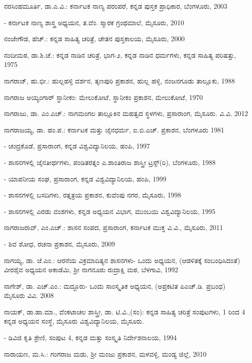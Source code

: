 \noindent
ನರಸಿಂಹಮೂರ್ತಿ, ಡಾ.ಎ.ವಿ.: ಕರ್ನಾಟಕ ನಾಣ್ಯ ಪರಂಪರೆ, ಕನ್ನಡ ಪುಸ್ತಕ ಪ್ರಾಧಿಕಾರ, ಬೆಂಗಳೂರು, 2003

- ಕರ್ನಾಟಕ ನಾಣ್ಯ ಶಾಸ್ತ್ರ ಅಧ್ಯಯನ, ತ.ವೆಂ. ಸ್ಮಾರಕ ಗ್ರಂಥಮಾಲೆ, ಮೈಸೂರು, 2010

\noindent
ನಂಜೇಗೌಡ, ಹೆಚ್​.: ಕನ್ನಡ ಸಾಹಿತ್ಯ ಚರಿತ್ರೆ, ಚೇತನ ಪುಸ್ತಕಾಲಯ, ಮೈಸೂರು, 2000

\noindent
ನಂದೀಮಠ, ಡಾ.ಶಿ.ಚೆ.: ಕನ್ನಡ ನಾಡಿನ ಚರಿತ್ರೆ, ಭಾಗ-೨, ಕನ್ನಡ ನಾಡಿನ ಧರ್ಮಗಳು, ಕನ್ನಡ ಸಾಹಿತ್ಯ ಪರಿಷತ್ತು, 1975

\noindent
ನಾಗರಾಜ್​, ಹು.ಭೀ.: ಹುಲ್ಲಹಳ್ಳಿ ದರ್ಶನ, ತೃಣಪುರಿ ಪ್ರಕಾಶನ, ಹುಲ್ಲ ಹಳ್ಳಿ, ನಂಜನಗೂಡು ತಾಲ್ಲೂಕು, 1988

\noindent
ನಾಗರಾಜ ಅಯ್ಯಂಗಾರ್​ ಸ್ಥಾನೀಕಂ: ಮೇಲುಕೋಟೆ, ಸ್ಥಾನೀಕಂ ಪ್ರಕಾಶನ, ಮೇಲುಕೋಟೆ, 1970

\noindent
ನಾಗರಾಜು, ಡಾ. ಎಂ.ಎಚ್​.: ನಾಗಮಂಗಲ ತಾಲ್ಲೂಕಿನ ಮಹತ್ವದ ಸ್ಥಳಗಳು, ಪ್ರಸಾರಾಂಗ, ಮೈಸೂರು. ವಿ.ವಿ. 2012

\noindent
ನಾಗರಾಜಯ್ಯ, ಡಾ. ಹಂ.ಪ.: ಕರ್ನಾಟಕ ಮತ್ತು ಜೈನಧರ್ಮ, ಐ.ಬಿ.ಎಚ್​. ಪ್ರಕಾಶನ, ಬೆಂಗಳೂರು 1981

- ಚಂದ್ರಕೊಡೆ, ಪ್ರಸಾರಾಂಗ, ಕನ್ನಡ ವಿಶ್ವವಿದ್ಯಾನಿಲಯ, ಹಂಪಿ, 1997

- ಶಾಸನಗಳಲ್ಲಿ ಜೈನತೀರ್ಥಗಳು, ಪಂಡಿತರತ್ನಂ ಎ.ಶಾಂತಿರಾಜ ಶಾಸ್ತ್ರೀ ಟ್ರಸ್ಟ್​(ರಿ), ಬೆಂಗಳೂರು, 1988

- ಯಾಪನೀಯ ಸಂಘ, ಪ್ರಸಾರಾಂಗ, ಕನ್ನಡ ವಿಶ್ವವಿದ್ಯಾನಿಲಯ, ಹಂಪಿ, 1999

- ಶಾಸನಗಳಲ್ಲಿ ಬಸದಿಗಳು, ರತ್ನತ್ರಯ ಪ್ರಕಾಶನ, ಕುವೆಂಪು ನಗರ, ಮೈಸೂರು, 1998

- ಶಾಸನಗಳಲ್ಲಿ ಎರಡು ವಂಶಗಳು, ಕನ್ನಡ ಅಧ್ಯಯನ ವಿಭಾಗ, ಮುಂಬಯಿ ವಿಶ್ವವಿದ್ಯಾನಿಲಯ, 1995

\noindent
ನಾಗರಾಜರಾವ್​, ಎಂ.ಎಚ್​.: ಶಾಸನ ಸಂಪದ, ಪ್ರಸಾರಾಂಗ, ಕರ್ನಾಟಕ ಮುಕ್ತ ವಿ.ವಿ., ಮೈಸೂರು, 2011

- ಶಿವ ಶೋಧ, ರಚನಾ ಪ್ರಕಾಶನ, ಮೈಸೂರು, 2009

\noindent
ನಾಗಯ್ಯ, ಡಾ. ಜೆ.ಎಂ.: ಆರನೆಯ ವಿಕ್ರಮಾದಿತ್ಯನ ಶಾಸನಗಳು- ಒಂದು ಅಧ್ಯಯನ, (ಆಡಳಿತಕ್ಕೆ ಸಂಬಂಧಿಸಿದಂತೆ) ವೀರಶೈವ ಅಧ್ಯಯನ ಅಕಾಡೆಮಿ, ಶ‍್ರೀ ನಾಗನೂರು ರುದ್ರಾಕ್ಷಿ ಮಠ, ಬೆಳಗಾವಿ, 1992

\noindent
ನಾಗೇಶ್​, ಡಾ. ಎಚ್​.ಎಂ.: ಮದ್ದೂರು- ಒಂದು ಸಾಂಸ್ಕೃತಿಕ ಅಧ್ಯಯನ, (ಅಪ್ರಕಟಿತ ಪಿಎಚ್​.ಡಿ. ಪ್ರಬಂಧ) ಮೈಸೂರು ವಿವಿ. 2008

\noindent
ನಾಯಕ್​, ಡಾ.ಹಾ.ಮಾ., ವೆಂಕಟಾಚಲ ಶಾಸ್ತ್ರೀ, ಡಾ. ಟಿ.ವಿ.,(ಸಂ): ಕನ್ನಡ ಸಾಹಿತ್ಯ ಚರಿತ್ರೆ ಸಂಪುಟಗಳು, 1 ರಿಂದ 4 ಕನ್ನಡ ಅಧ್ಯಯನ ಸಂಸ್ಥೆ, ಮೈಸೂರು ವಿಶ್ವವಿದ್ಯಾನಿಲಯ, ಮೈಸೂರು.

- ಡಿವಿಜಿ ಕೃತಿ ಶ್ರೇಣಿ, ಸಂಪುಟ 4, ಕನ್ನಡ ಮತ್ತು ಸಂಸ್ಕೃತಿ ನಿರ್ದೇಶನಾಲಯ, 1994

\noindent
ನಾರಾಯಣ, ಮ.ಸಿ.: ಗಂಗರಾಜ ಮಡು, ಶ‍್ರೀ ಮಂಜು ಪ್ರಕಾಶನ, ಮಳವಳ್ಳಿ, ಮಂಡ್ಯ ಜಿಲ್ಲೆ, 2010

